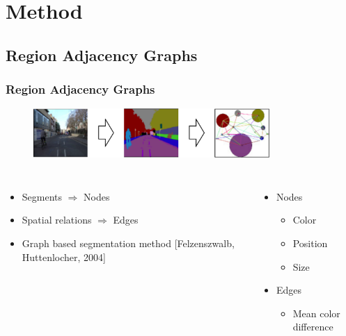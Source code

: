 \section{Method}
\subsection{Region Adjacency Graphs}
\frame
{
	\frametitle{Region Adjacency Graphs}
	
	\begin{figure}[p]
		\centering
		\includegraphics[width = 0.8\textwidth]{img/master/cover}
		\label{fig:rag}
	\end{figure}
	
	\begin{columns}[T]
		\begin{itemize}
			\item Segments $\Rightarrow$ Nodes
			\item Spatial relations $\Rightarrow$ Edges
			\item Graph based segmentation method [Felzenszwalb, Huttenlocher, 2004]
		\end{itemize}
		
		
		\vspace{-0.5cm}
		\begin{itemize}
			\item Nodes
			\begin{itemize}
				\item Color
				\item Position
				\item Size
			\end{itemize}
			\item Edges
			\begin{itemize}
				\item Mean color difference
			\end{itemize}
		\end{itemize}
	\end{columns}
	
}
